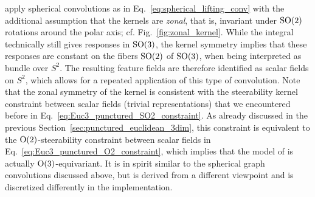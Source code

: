 \citet{esteves2018zonalSpherical} apply spherical convolutions as in Eq.~\eqref{eq:spherical_lifting_conv} with the additional assumption that the kernels are \emph{zonal}, that is, invariant under $\operatorname{SO}(2)$ rotations around the polar axis; cf. Fig.~\ref{fig:zonal_kernel}.
While the integral technically still gives responses in $\operatorname{SO}(3)$, the kernel symmetry implies that these responses are constant on the fibers $\operatorname{SO}(2)$ of $\operatorname{SO}(3)$, when being interpreted as bundle over $S^2$.
The resulting feature fields are therefore identified as scalar fields on $S^2$, which allows for a repeated application of this type of convolution.
Note that the zonal symmetry of the kernel is consistent with the steerability kernel constraint between scalar fields (trivial representations) that we encountered before in Eq.~\eqref{eq:Euc3_punctured_SO2_constraint}.
As already discussed in the previous Section~\ref{sec:punctured_euclidean_3dim}, this constraint is equivalent to the $\operatorname{O}(2)$-steerability constraint between scalar fields in Eq.~\eqref{eq:Euc3_punctured_O2_constraint}, which implies that the model of \citet{esteves2018zonalSpherical} is actually $\operatorname{O}(3)$-equivariant.
It is in spirit similar to the spherical graph convolutions discussed above, but is derived from a different viewpoint and is discretized differently in the implementation.


